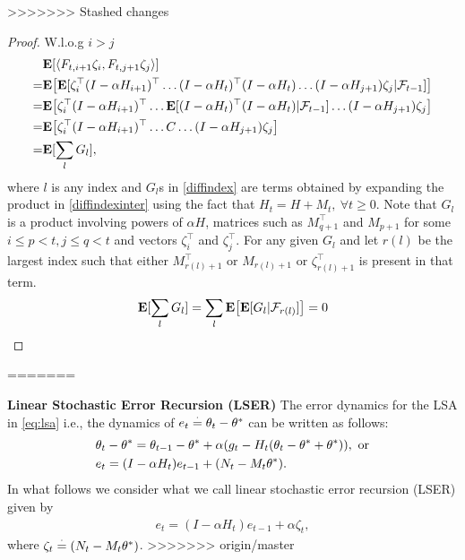 >>>>>>> Stashed changes
\begin{proof}
W.l.o.g  $i>j$
\begin{align}
&\mathbf{E}[\langle F_{t,i+1} \zeta_{i},F_{t,j+1} \zeta_{j}\rangle]\nonumber\\
\label{diffindexinter}=&\mathbf{E}\big[\mathbf{E}[ \zeta^\top_{i}(I-\alpha H_{i+1})^\top\ldots(I-\alpha H_t)^\top(I-\alpha H_t)\ldots(I-\alpha H_{j+1}) \zeta_{j}|\mathcal{F}_{t-1}]\big]\\
=&\mathbf{E}\big[ \zeta^\top_{i}(I-\alpha H_{i+1})^\top\ldots\mathbf{E}[(I-\alpha H_t)^\top(I-\alpha H_t)|\mathcal{F}_{t-1}]\ldots(I-\alpha H_{j+1}) \zeta_{j}\big]\\
=&\mathbf{E}\big[ \zeta^\top_{i}(I-\alpha H_{i+1})^\top\ldots C\ldots(I-\alpha H_{j+1}) \zeta_{j}\big]\\
\label{diffindex}=&\mathbf{E}[ \sum_{l} G_l],
\end{align}
where $l$ is any index and $G_l$s in \eqref{diffindex} are terms obtained by expanding the product in \eqref{diffindexinter} using the fact that $H_t=H+M_{t},~\forall t\geq 0$. Note that $G_l$ is a product involving powers of $\alpha H$, matrices such as $M^\top_{q+1}$ and $M_{p+1}$ for some $ i\leq p<t, j\leq q < t$ and vectors $\zeta^\top_i$ and $\zeta^\top_j$.
For any given $G_l$ and let $r(l)$ be the largest index such that either $M^\top_{r(l)+1}$ or $M_{r(l)+1}$ or $\zeta^\top_{r(l)+1}$ is present in that term.
\begin{align*}
\mathbf{E}[ \sum_{l} G_l]=  \sum_{l} \mathbf{E}\big[\mathbf{E}[G_l|\mathcal{F}_{r(l)}]\big]=0
\end{align*}
\end{proof}
=======


\textbf{Linear Stochastic Error Recursion (LSER)} The error dynamics for the LSA in \eqref{eq:lsa} i.e., the dynamics of $e_t\stackrel{\cdot}{=}\theta_t-\theta^*$ can be written as follows:
\begin{align}\label{errprelim}
&\theta_t-\theta^*=\theta_{t-1}-\theta^*+\alpha(g_t -H_t(\theta_t-\theta^*+\theta^*)),\text{~or}\nonumber\\
&e_t=(I-\alpha H_t)e_{t-1}+(N_t-M_t\theta^*).
\end{align}
In what follows we consider what we call linear stochastic error recursion (LSER) given by
\begin{align}\label{lsergen}
e_t=(I-\alpha H_t)e_{t-1}+\alpha \zeta_t,
\end{align}
where $\zeta_t\stackrel{\cdot}{=} (N_t-M_t\theta^*)$.
>>>>>>> origin/master
